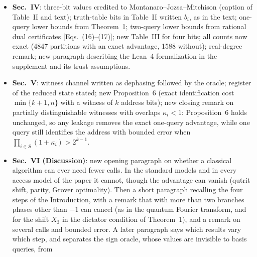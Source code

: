 \documentclass[11pt]{article}
\begin{document}
\begin{itemize}[leftmargin=*]
with the sum of the dual terms written out;
Corollary~1 rewritten and retitled (transposition versus cyclic shift, shift with
an added phase, general \(X_d\) with \(d\ge2\)); new Theorem~1 (complete one-query
classification of total Boolean functions for every response unitary), with
a remark that promise problems such as Deutsch--Jozsa lie outside it, a
remark that every response with the classical readout \(V\ket0\propto\ket1\)
meets the dictator condition, and with the equality case used in its proof
stated explicitly; new
Proposition~5 (optimal bounded-error solution for odd cyclic responses,
\(d\ge3\)), with the referee's construction and a remark that it is also
optimal among unambiguous protocols; parity paragraph with explicit dual witness, degree
bound for every response, and an open question.
\item \textbf{Sec.~IV}: three-bit values credited to Montanaro--Jozsa--Mitchison
(caption of Table~II and text); truth-table bits in Table~II written \(b_i\),
as in the text; one-query lower bounds from Theorem~1;
two-query lower bounds from rational dual certificates [Eqs.~(16)--(17)];
new Table~III for four bits; all counts now exact (4847 partitions with an
exact advantage, 1588 without); real-degree remark; new paragraph describing
the Lean~4 formalization in the supplement and its trust assumptions.
\item \textbf{Sec.~V}: witness channel written as dephasing followed by the
oracle; register of the reduced state stated; new Proposition~6 (exact
identification cost \(\min\{k+1,n\}\) with a witness of \(k\) address bits);
new closing remark on partially distinguishable witnesses with overlaps
\(\kappa_i<1\): Proposition~6 holds unchanged, so any leakage removes the exact
one-query advantage, while one query still identifies the address with bounded
error when \(\prod_{i\in S}(1+\kappa_i)>2^{k-1}\).
\item \textbf{Sec.~VI (Discussion)}: new opening paragraph on whether a
classical algorithm can ever need fewer calls. In the standard models and in
every access model of the paper it cannot, though the advantage can vanish
(qutrit shift, parity, Grover optimality). Then a short paragraph recalling the
four steps of the Introduction, with a remark that with more than two branches
phases other than \(-1\) can cancel (as in the quantum Fourier transform, and
for the shift \(X_3\) in the dictator condition of Theorem~1), and a remark on
several calls and bounded error. A later paragraph says which results vary which step, and
separates the sign oracle, whose values are invisible to basis queries, from

\end{itemize}
\end{document}
